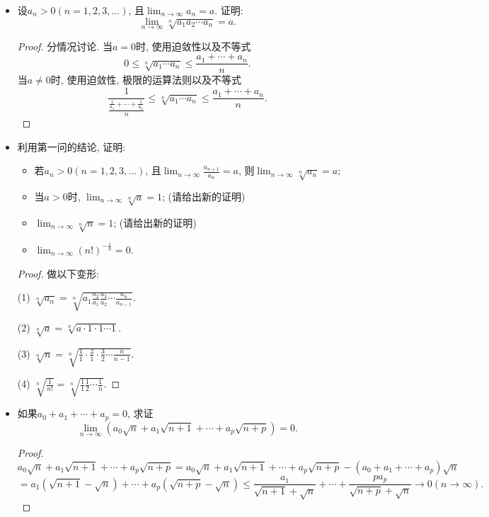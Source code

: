 \documentclass[UTF8,11pt, a4paper, oneside, fontset=none]{ctexbook}
\begin{document}
\begin{itemize}
\item[1.] 设$a_n>0 (n = 1, 2, 3, \ldots)$, 且$\lim_{n \to \infty} a_n =a$. 证明:
\[
\lim_{n \to \infty} \sqrt[n]{a_1 a_2 \cdots a_n} = a.
\]

\begin{proof}
分情况讨论. 当$a=0$时, 使用迫敛性以及不等式
\[
0 \leq \sqrt[n]{a_1 \cdots a_n} \leq \frac{a_1 + \cdots + a_n}{n}.
\]
当$a\neq 0$时, 使用迫敛性, 极限的运算法则以及不等式
\[
\frac{1}{\frac{\frac{1}{a_1} + \cdots + \frac{1}{a_n}}{n}}\leq \sqrt[n]{a_1 \cdots a_n} \leq \frac{a_1 + \cdots + a_n}{n}.
\]
\end{proof}

\item[2.] 利用第一问的结论, 证明:
\begin{itemize}
\item[(1)] 若$a_n>0 (n = 1, 2, 3, \ldots)$, 且$\lim_{n \to \infty}\frac{a_{n+1}}{a_n} =a$, 则$\lim_{n \to \infty} \sqrt[n]{a_n} =a$;
\item[(2)] 当$a>0$时, $\lim_{n \to \infty} \sqrt[n]{a} = 1$; (请给出新的证明)
\item[(3)] $\lim_{n \to \infty} \sqrt[n]{n} =1$; (请给出新的证明)
\item[(4)] $\lim_{n \to \infty} (n!)^{-\frac{1}{n}} =0$.
\end{itemize} 

\begin{proof} 做以下变形:

(1) $\sqrt[n]{a_n} = \sqrt[n]{a_1 \frac{a_2}{a_1} \frac{a_3}{a_2}\cdots \frac{a_n}{a_{n-1}}}$.

(2) $\sqrt[n]{a} = \sqrt[n]{a \cdot 1 \cdot 1 \cdots 1}$.

(3) $\sqrt[n]{n} = \sqrt[n]{\frac{1}{1} \cdot \frac{2}{1} \cdot \frac{3}{2} \cdots \frac{n}{n-1}}$.

(4) $\sqrt[n]{\frac{1}{n!}} = \sqrt[n]{\frac{1}{1} \frac{1}{2} \cdots \frac{1}{n}}$.


\end{proof}


\item[4.]
如果$a_0 + a_1 + \cdots + a_p =0$, 求证
\[
\lim_{n \to \infty} (a_0 \sqrt n + a_1 \sqrt{n+1} + \cdots + a_p \sqrt{n+p})=0.
\]

\begin{proof}

\[
a_0 \sqrt n + a_1 \sqrt{n+1} + \cdots + a_p \sqrt{n+p} = a_0 \sqrt n + a_1 \sqrt{n+1} + \cdots + a_p \sqrt{n+p}  - (a_0 + a_1 + \cdots + a_p) \sqrt{n} 
\]
\[
= a_1 (\sqrt{n+1}-\sqrt{n}) + \cdots + a_p (\sqrt{n+p} - \sqrt{n}) \leq \frac{a_1}{\sqrt{n+1} + \sqrt{n}} + \cdots + \frac{p a_p}{\sqrt{n+p} + \sqrt{n}} \to 0 (n \to \infty).
\]



\end{proof}
\end{itemize}
\end{document}
